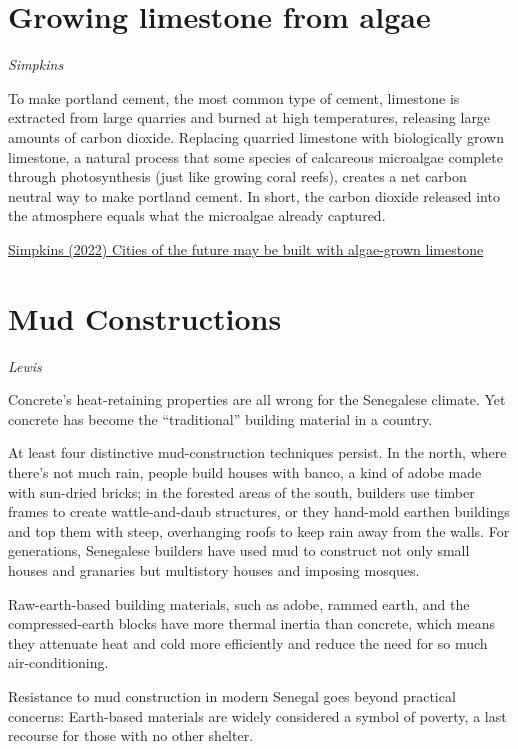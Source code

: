 \documentclass[
]{book}
\begin{document}
\hypertarget{growing-limestone-from-algae}{%
\section{Growing limestone from algae}\label{growing-limestone-from-algae}}

\emph{Simpkins}

To make portland cement, the most common type of cement, limestone is extracted from large quarries and burned at high temperatures, releasing large amounts of carbon dioxide.
Replacing quarried limestone with biologically grown limestone, a natural process that some species of calcareous microalgae complete through photosynthesis (just like growing coral reefs), creates a net carbon neutral way to make portland cement. In short, the carbon dioxide released into the atmosphere equals what the microalgae already captured.

\href{https://www.colorado.edu/today/2022/06/23/cities-future-may-be-built-algae-grown-limestone}{Simpkins (2022) Cities of the future may be built with algae-grown limestone}

\hypertarget{mud-constructions}{%
\section{Mud Constructions}\label{mud-constructions}}

\emph{Lewis}

Concrete's heat-retaining properties are all wrong for the Senegalese climate.
Yet concrete has become the ``traditional'' building material in a country.

At least four distinctive mud-construction techniques persist. In the north, where there's not much rain, people build houses with banco, a kind of adobe made with sun-dried bricks; in the forested areas of the south, builders use timber frames to create wattle-and-daub structures, or they hand-mold earthen buildings and top them with steep, overhanging roofs to keep rain away from the walls. For generations, Senegalese builders have used mud to construct not only small houses and granaries but multistory houses and imposing mosques.

Raw-earth-based building materials, such as adobe, rammed earth, and the compressed-earth blocks have more thermal inertia than concrete, which means they attenuate heat and cold more efficiently and reduce the need for so much air-conditioning.

Resistance to mud construction in modern Senegal goes beyond practical concerns: Earth-based materials are widely considered a symbol of poverty, a last recourse for those with no other shelter.
\end{document}
